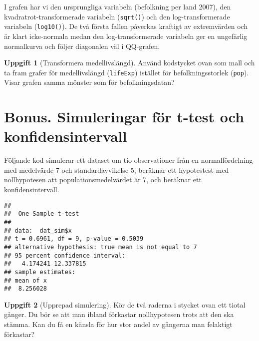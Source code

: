 \documentclass[
]{book}
\newenvironment{Shaded}{\begin{snugshade}}{\end{snugshade}}
\newcommand{\AttributeTok}[1]{\textcolor[rgb]{0.77,0.63,0.00}{#1}}
\newcommand{\DecValTok}[1]{\textcolor[rgb]{0.00,0.00,0.81}{#1}}
\newcommand{\FunctionTok}[1]{\textcolor[rgb]{0.00,0.00,0.00}{#1}}
\newcommand{\NormalTok}[1]{#1}
\newcommand{\OtherTok}[1]{\textcolor[rgb]{0.56,0.35,0.01}{#1}}
\newcommand{\SpecialCharTok}[1]{\textcolor[rgb]{0.00,0.00,0.00}{#1}}
\theoremstyle{definition}
\theoremstyle{definition}
\theoremstyle{definition}
\newtheorem{exercise}{Uppgift}[chapter]
\theoremstyle{definition}
\theoremstyle{remark}
\begin{document}
I grafen har vi den ursprungliga variabeln (befolkning per land 2007), den kvadratrot-transformerade variabeln (\texttt{sqrt()}) och den log-transformerade variabeln (\texttt{log10()}). De två första fallen påverkas kraftigt av extremvärden och är klart icke-normala medan den log-transformerade variabeln ger en ungefärlig normalkurva och följer diagonalen väl i QQ-grafen.

\begin{exercise}[Transformera medellivslängd]
Använd kodstycket ovan som mall och ta fram grafer för medellivslängd (\texttt{lifeExp}) istället för befolkningsstorlek (\texttt{pop}). Visar grafen samma mönster som för befolkningsdatan?
\end{exercise}

\hypertarget{bonus.-simuleringar-fuxf6r-t-test-och-konfidensintervall}{%
\section{Bonus. Simuleringar för t-test och konfidensintervall}\label{bonus.-simuleringar-fuxf6r-t-test-och-konfidensintervall}}

Följande kod simulerar ett dataset om tio observationer från en normalfördelning med medelvärde 7 och standardavvikelse 5, beräknar ett hypotestest med nollhypotesen att populationsmedelvärdet är 7, och beräknar ett konfidensintervall.

\begin{Shaded}
\end{Shaded}

\begin{verbatim}
## 
##  One Sample t-test
## 
## data:  dat_sim$x
## t = 0.6961, df = 9, p-value = 0.5039
## alternative hypothesis: true mean is not equal to 7
## 95 percent confidence interval:
##   4.174241 12.337815
## sample estimates:
## mean of x 
##  8.256028
\end{verbatim}

\begin{exercise}[Upprepad simulering]
Kör de två raderna i stycket ovan ett tiotal gånger. Du bör se att man ibland förkastar nollhypotesen trots att den ska stämma. Kan du få en känsla för hur stor andel av gångerna man felaktigt förkastar?
\end{exercise}
\end{document}
